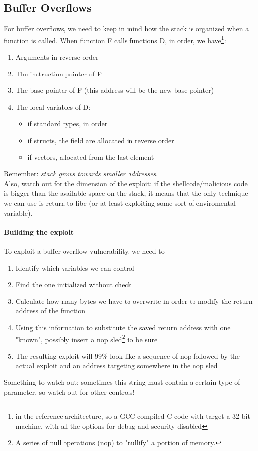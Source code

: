 \documentclass{article}
\begin{document}
			\subsection{Buffer Overflows}
				For buffer overflows, we need to keep in mind how the stack is organized when a function is called. When function F calls functions D, in order, we have\footnote{in the reference architecture, so a GCC compiled C code with target a 32 bit machine, with all the options for debug and security disabled}:
				\begin{enumerate}
					\item Arguments in reverse order
					\item The instruction pointer of F
					\item The base pointer of F (this address will be the new base pointer)
					\item The local variables of D:
						\begin{itemize}
							\item if standard types, in order
							\item if structs, the field are allocated in reverse order
							\item if vectors, allocated from the last element
						\end{itemize}
				\end{enumerate}
				Remember: \emph{stack grows towards smaller addresses}.\\
				Also, watch out for the dimension of the exploit: if the shellcode/malicious code is bigger than the available space on the stack, it means that the only technique we can use is return to libc (or at least exploiting some sort of enviromental variable). 
				
				\paragraph{Building the exploit}
					To exploit a buffer overflow vulnerability, we need to
					\begin{enumerate}
						\item Identify which variables we can control
						\item Find the one initialized without check
						\item Calculate how many bytes we have to overwrite in order to modify the return address of the function
						\item Using this information to substitute the saved return address with one "known", possibly insert a nop sled\footnote{A series of null operations (nop) to "nullify" a portion of memory.} to be sure
						\item The resulting exploit will 99\% look like a sequence of nop followed by the actual exploit and an address targeting somewhere in the nop sled
					\end{enumerate}
					Something to watch out: sometimes this string must contain a certain type of parameter, so watch out for other controls!
				
\end{document}
